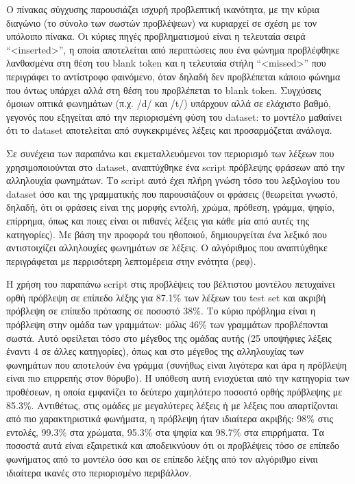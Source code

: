 Ο πίνακας σύγχυσης παρουσιάζει ισχυρή προβλεπτική ικανότητα, με την κύρια διαγώνιο (το σύνολο των σωστών προβλέψεων) να κυριαρχεί σε σχέση με τον υπόλοιπο πίνακα. Οι κύριες πηγές προβληματισμού είναι η τελευταία σειρά ``<inserted>'', η οποία αποτελείται από περιπτώσεις που ένα φώνημα προβλέφθηκε λανθασμένα στη θέση του blank token και η τελευταία στήλη ``<missed>'' που περιγράφει το αντίστροφο φαινόμενο, όταν δηλαδή δεν προβλέπεται κάποιο φώνημα που όντως υπάρχει αλλά στη θέση του προβλέπεται το blank token. Συγχύσεις όμοιων οπτικά φωνημάτων (π.χ. /d/ και /t/) υπάρχουν αλλά σε ελάχιστο βαθμό, γεγονός που εξηγείται από την περιορισμένη φύση του dataset: το μοντέλο μαθαίνει ότι το dataset αποτελείται από συγκεκριμένες λέξεις και προσαρμόζεται ανάλογα.

Σε συνέχεια των παραπάνω και εκμεταλλευόμενοι τον περιορισμό των λέξεων που χρησιμοποιούνται στο dataset, αναπτύχθηκε ένα script πρόβλεψης φράσεων από την αλληλουχία φωνημάτων. Το script αυτό έχει πλήρη γνώση τόσο του λεξιλογίου του dataset όσο και της γραμματικής που παρουσιάζουν οι φράσεις (θεωρείται γνωστό, δηλαδή, ότι οι φράσεις είναι της μορφής εντολή, χρώμα, πρόθεση, γράμμα, ψηφίο, επίρρημα, όπως και ποιες είναι οι πιθανές λέξεις για κάθε μία από αυτές της κατηγορίες). Με βάση την προφορά του ηθοποιού, δημιουργείται ένα λεξικό που αντιστοιχίζει αλληλουχίες φωνημάτων σε λέξεις. Ο αλγόριθμος που αναπτύχθηκε περιγράφεται με περρισότερη λεπτομέρεια στην ενότητα (ρεφ).

Η χρήση του παραπάνω script στις προβλέψεις του βέλτιστου μοντέλου πετυχαίνει ορθή πρόβλεψη σε επίπεδο λέξης για 87.1\% των λέξεων του test set και ακριβή πρόβλεψη σε επίπεδο πρότασης σε ποσοστό 38\%. Το κύριο πρόβλημα είναι η πρόβλεψη στην ομάδα των γραμμάτων: μόλις 46\% των γραμμάτων προβλέπονται σωστά. Αυτό οφείλεται τόσο στο μέγεθος της ομάδας αυτής (25 υποψήφιες λέξεις έναντι 4 σε άλλες κατηγορίες), όπως και στο μέγεθος της αλληλουχίας των φωνημάτων που αποτελούν ένα γράμμα (συνήθως είναι λιγότερα και άρα η πρόβλεψη είναι πιο επιρρεπής στον θόρυβο). Η υπόθεση αυτή ενισχύεται από την κατηγορία των προθέσεων, η οποία εμφανίζει το δεύτερο χαμηλότερο ποσοστό ορθής πρόβλεψης με 85.3\%. Αντιθέτως, στις ομάδες με μεγαλύτερες λέξεις ή με λέξεις που απαρτίζονται από πιο χαρακτηριστικά φωνήματα, η πρόβλεψη ήταν ιδιαίτερα ακριβής: 98\% στις εντολές, 99.3\% στα χρώματα, 95.3\% στα ψηφία και 98.7\% στα επιρρήματα. Τα ποσοστά αυτά είναι εξαιρετικά και αποδεικνύουν ότι οι προβλέψεις τόσο σε επίπεδο φωνήματος από το μοντέλο όσο και σε επίπεδο λέξης από τον αλγόριθμο είναι ιδιαίτερα ικανές στο περιορισμένο περιβάλλον.

